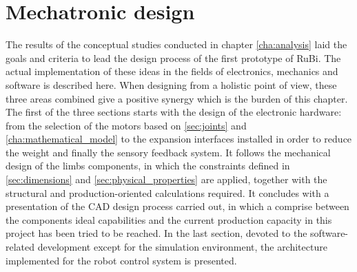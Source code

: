 \chapter{Mechatronic design} %
\label{cha:design}
The results of the conceptual studies conducted in chapter \ref{cha:analysis} laid the goals and criteria to lead the design process of the first prototype of RuBi.
The actual implementation of these ideas in the fields of electronics, mechanics and software is described here.
When designing from a holistic point of view, these three areas combined give a positive synergy which is the burden of this chapter.
The first of the three sections starts with the design of the electronic hardware: from the selection of the motors based on \ref{sec:joints} and \ref{cha:mathematical_model} to the expansion interfaces installed in order to reduce the weight and finally the sensory feedback system.
It follows the mechanical design of the limbs components, in which the constraints defined in \ref{sec:dimensions} and \ref{sec:physical_properties} are applied, together with the structural and production-oriented calculations required.
It concludes with a presentation of the CAD design process carried out, in which a comprise between the components ideal capabilities and the current production capacity in this project has been tried to be reached.
In the last section, devoted to the software-related development except for the simulation environment, the architecture implemented for the robot control system is presented.





